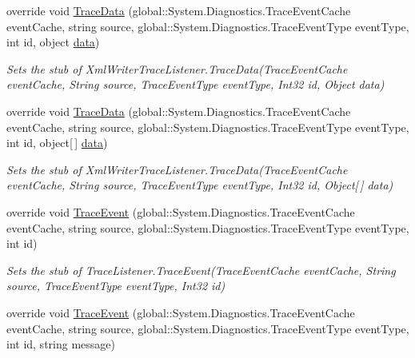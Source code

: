 \begin{DoxyCompactItemize}
override void \hyperlink{class_system_1_1_diagnostics_1_1_fakes_1_1_stub_xml_writer_trace_listener_a36918e3076af939798f82e8729ec828a}{Trace\-Data} (global\-::\-System.\-Diagnostics.\-Trace\-Event\-Cache event\-Cache, string source, global\-::\-System.\-Diagnostics.\-Trace\-Event\-Type event\-Type, int id, object \hyperlink{jquery-1_810_82-vsdoc_8js_a609407b3456fdc3c5671a9fc4a226ff7}{data})
\begin{DoxyCompactList}\small\item\em Sets the stub of Xml\-Writer\-Trace\-Listener.\-Trace\-Data(\-Trace\-Event\-Cache event\-Cache, String source, Trace\-Event\-Type event\-Type, Int32 id, Object data)\end{DoxyCompactList}\item 
override void \hyperlink{class_system_1_1_diagnostics_1_1_fakes_1_1_stub_xml_writer_trace_listener_adf53d598a6e6ca7e6fb54a63b9d11b1e}{Trace\-Data} (global\-::\-System.\-Diagnostics.\-Trace\-Event\-Cache event\-Cache, string source, global\-::\-System.\-Diagnostics.\-Trace\-Event\-Type event\-Type, int id, object\mbox{[}$\,$\mbox{]} \hyperlink{jquery-1_810_82-vsdoc_8js_a609407b3456fdc3c5671a9fc4a226ff7}{data})
\begin{DoxyCompactList}\small\item\em Sets the stub of Xml\-Writer\-Trace\-Listener.\-Trace\-Data(\-Trace\-Event\-Cache event\-Cache, String source, Trace\-Event\-Type event\-Type, Int32 id, Object\mbox{[}$\,$\mbox{]} data)\end{DoxyCompactList}\item 
override void \hyperlink{class_system_1_1_diagnostics_1_1_fakes_1_1_stub_xml_writer_trace_listener_a5de012ef0bd8912bd6d6067cf1d8977f}{Trace\-Event} (global\-::\-System.\-Diagnostics.\-Trace\-Event\-Cache event\-Cache, string source, global\-::\-System.\-Diagnostics.\-Trace\-Event\-Type event\-Type, int id)
\begin{DoxyCompactList}\small\item\em Sets the stub of Trace\-Listener.\-Trace\-Event(\-Trace\-Event\-Cache event\-Cache, String source, Trace\-Event\-Type event\-Type, Int32 id)\end{DoxyCompactList}\item 
override void \hyperlink{class_system_1_1_diagnostics_1_1_fakes_1_1_stub_xml_writer_trace_listener_a72e8ce8e6385c9a0919aab8053b20380}{Trace\-Event} (global\-::\-System.\-Diagnostics.\-Trace\-Event\-Cache event\-Cache, string source, global\-::\-System.\-Diagnostics.\-Trace\-Event\-Type event\-Type, int id, string message)

\end{DoxyCompactItemize}
